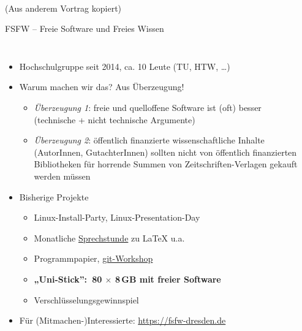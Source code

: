 \documentclass{beamer}
\begin{document}
\begin{frame}[label=wb]
\begin{center}
 \vspace{10mm}
\\
{\tiny(Aus anderem Vortrag kopiert)}
\end{center}

\end{frame}



\begin{frame}{FSFW – Freie Software und Freies Wissen}

% 
\begin{columns}

\vspace{-5mm}
  \begin{itemize}
  \item Hochschulgruppe seit 2014, ca. 10 Leute (TU, HTW, …)
  \item Warum machen wir das? Aus Überzeugung!

  \begin{itemize}
  \item \emph{Überzeugung 1}: freie und quelloffene Software ist (oft) besser\\
    (technische + nicht technische Argumente)\\
    \bigskip
    \pause
  \item \emph{Überzeugung 2}: öffentlich finanzierte wissenschaftliche Inhalte
    (AutorInnen, GutachterInnen) sollten nicht von öffentlich finanzierten
    Bibliotheken für horrende Summen von Zeitschriften-Verlagen gekauft werden
    müssen
  \end{itemize}

    \pause
  \item Bisherige Projekte
    \begin{itemize}
    \item Linux-Install-Party, Linux-Presentation-Day
    \item Monatliche \href{https://fsfw-dresden.de/sprechstunde}{Sprechstunde} zu \LaTeX{} u.a.
    \item Programmpapier, \href{https://fsfw-dresden.de/git-ws}{git-Workshop}
    \item \textbf<4-5>{„Uni-Stick”:~80 $\times$ 8\,GB mit freier Software}
    \item Verschlüsselungsgewinnspiel
    \end{itemize}
    \pause
    \pause
    \pause
    \item Für (Mitmachen-)Interessierte: \url{https://fsfw-dresden.de}
  \end{itemize}


\end{columns}
\end{frame}
\end{document}
